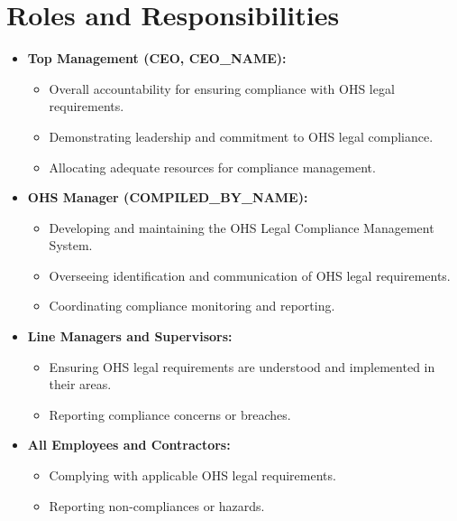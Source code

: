 \documentclass[11pt]{article}
\newcommand{\compilerName}{{{COMPILED_BY_NAME}}}
\begin{document}
\section{Roles and Responsibilities}
\begin{itemize}
    \item \textbf{Top Management (CEO, {{CEO_NAME}}):}
    \begin{itemize}
        \item Overall accountability for ensuring compliance with OHS legal requirements.
        \item Demonstrating leadership and commitment to OHS legal compliance.
        \item Allocating adequate resources for compliance management.
    \end{itemize}
    \item \textbf{OHS Manager (\compilerName):}
    \begin{itemize}
        \item Developing and maintaining the OHS Legal Compliance Management System.
        \item Overseeing identification and communication of OHS legal requirements.
        \item Coordinating compliance monitoring and reporting.
    \end{itemize}
    \item \textbf{Line Managers and Supervisors:}
    \begin{itemize}
        \item Ensuring OHS legal requirements are understood and implemented in their areas.
        \item Reporting compliance concerns or breaches.
    \end{itemize}
    \item \textbf{All Employees and Contractors:}
    \begin{itemize}
        \item Complying with applicable OHS legal requirements.
        \item Reporting non-compliances or hazards.
    \end{itemize}
\end{itemize}
\end{document}
